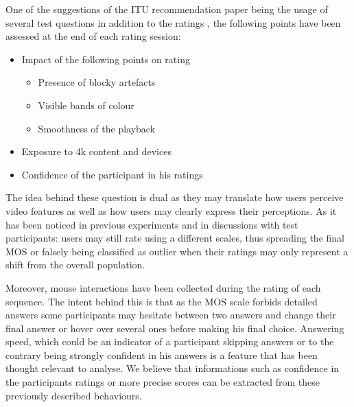 One of the suggestions of the ITU recommendation paper being the usage of several test questions in addition to the ratings \cite{rec1998p}, the following points have been assessed at the end of each rating session:
\begin{itemize}
	\item Impact of the following points on rating 
	\begin{itemize}
		\item Presence of blocky artefacts
		\item Visible bands of colour
		\item Smoothness of the playback
	\end{itemize}
	\item Exposure to 4k content and devices
	\item Confidence of the participant in his ratings
\end{itemize}

The idea behind these question is dual as they may translate how users perceive video features as well as how users may clearly express their perceptions. As it has been noticed in previous experiments and in discussions with test participants: users may still rate using a different scales, thus spreading the final MOS or falsely being classified as outlier when their ratings may only represent a shift from the overall population. 

Moreover, mouse interactions have been collected during the rating of each sequence. The intent behind this is that as the MOS scale forbids detailed answers some participants may hesitate between two answers and change their final answer or hover over several ones before making his final choice.
Answering speed, which could be an indicator of a participant skipping answers or to the contrary being strongly confident in his answers is a feature that has been thought relevant to analyse. 
We believe that informations such as confidence in the participants ratings or more precise scores can be extracted from these previously described behaviours.
